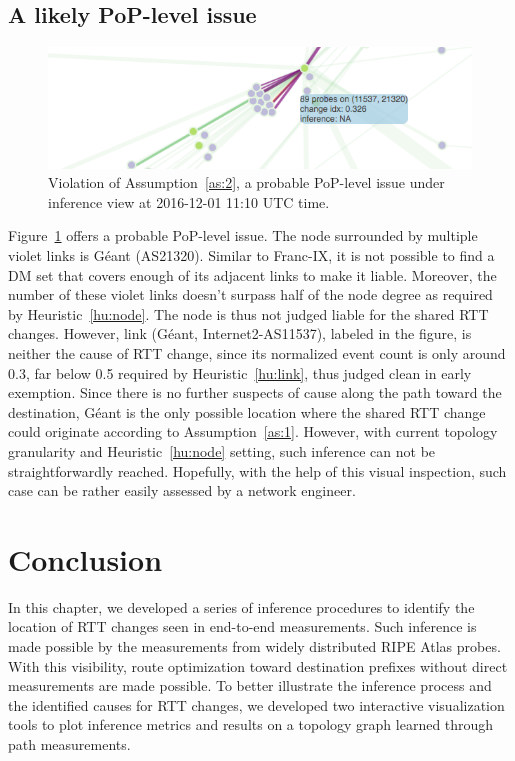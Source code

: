 \subsection{A likely PoP-level issue}
\begin{figure}[!htb]
\centering
\includegraphics[width=.8\textwidth]{gfx/chap5/case_pop_issue.png}
\caption{Violation of Assumption~\ref{as:2}, a probable PoP-level issue under inference view at 2016-12-01 11:10 UTC time.}
\label{fig:case_pop_issue}
\end{figure}

Figure~\ref{fig:case_pop_issue} offers a probable PoP-level issue. The node surrounded by multiple violet links is 
Géant (AS21320). 
Similar to Franc-IX, it is not possible to find a \ac{DM} set that covers enough of its adjacent links to make it liable. Moreover, the number of these violet links doesn't surpass half of the node degree as required by Heuristic~\ref{hu:node}. The node is thus not judged liable for the shared RTT changes. 
However, link (Géant, Internet2-AS11537), labeled in the figure, is neither the cause of RTT change, since its normalized event count is only around 0.3, far below 0.5 required by Heuristic~\ref{hu:link}, thus judged clean in early exemption.
Since there is no further suspects of cause along the path toward the destination, Géant is the only possible location where the shared RTT change could originate according to Assumption~\ref{as:1}. However, with current topology granularity and Heuristic~\ref{hu:node} setting, such inference can not be straightforwardly reached.
Hopefully, with the help of this visual inspection, such case can be rather easily assessed by a network engineer.

\section*{Conclusion}
In this chapter, we developed a series of inference procedures to identify the location of RTT changes seen in end-to-end measurements.
Such inference is made possible by the measurements from widely distributed RIPE Atlas probes.
With this visibility, route optimization toward destination prefixes without direct measurements are made possible.
To better illustrate the inference process and the identified causes for RTT changes, we developed two interactive visualization tools to plot inference metrics and results on a topology graph learned through path measurements.

